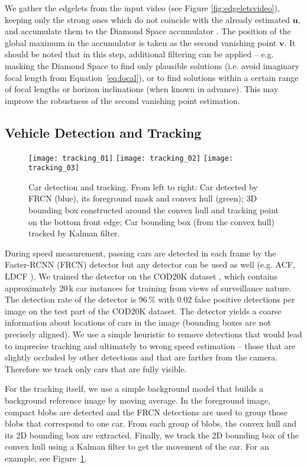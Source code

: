 \documentclass[]{elsarticle}
\begin{document}
We gather the edgelets from the input video (see Figure \ref{fig:edgeletsvideo}), keeping only the strong ones which do not coincide with the already estimated $\mathbf{u}$, and accumulate them to the Diamond Space accumulator \citep{Dubska2013}. The position of the global maximum in the accumulator is taken as the second vanishing point $\mathbf{v}$. It should be noted that in this step, additional filtering can be applied -- e.g. masking the Diamond Space to find only plausible solutions (i.e. avoid imaginary focal length from Equation~\eqref{eq:focal}), or to find solutions within a certain range of focal lengths or horizon inclinations (when known in advance). This may improve the robustness of the second vanishing point estimation.

\subsection{Vehicle Detection and Tracking} \label{sec:DetectionTracking}
\begin{figure}[t]
	\centering
	\texttt{[image: tracking\_01]}\hfill
	\texttt{[image: tracking\_02]}\hfill
	\texttt{[image: tracking\_03]}
	\caption{Car detection and tracking. From left to right: Car detected by FRCN (blue), its foreground mask and convex hull (green); 3D bounding box constructed around the convex hull and tracking point on the bottom front edge; Car bounding box (from the convex hull) tracked by Kalman filter.}
	\label{fig:DetectionTracking}
\end{figure}
During speed measurement, passing cars are detected in each frame by the Faster-RCNN (FRCN) detector \citep{Girshick2015} but any detector can be used as well (e.g. ACF, LDCF \citep{Dollar2014}). We trained the detector on the COD20K dataset \citep{Juranek2015}, which contains approximately 20\,k car instances for training from views of surveillance nature. The detection rate of the detector is 96\,\% with 0.02 false positive detections per image on the test part of the COD20K dataset. The detector yields a coarse information about locations of cars in the image (bounding boxes are not precisely aligned).
We use a simple heuristic to remove detections that would lead to imprecise tracking and ultimately to wrong speed estimation -- those that are slightly occluded by other detections and that are farther from the camera. Therefore we track only cars that are fully visible.

For the tracking itself, we use a simple background model that builds a background reference image by moving average. In the foreground image, compact blobs are detected and the FRCN detections are used to group those blobs that correspond to one car. From each group of blobs, the convex hull and its 2D bounding box are extracted. Finally, we track the 2D bounding box of the convex hull using a Kalman filter to get the movement of the car. For an example, see Figure~\ref{fig:DetectionTracking}.
\end{document}

